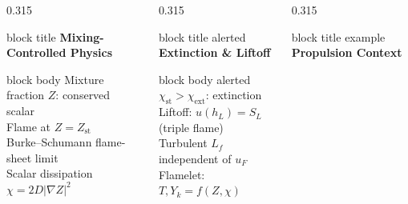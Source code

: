 \documentclass[12pt,aspectratio=169]{beamer}
\begin{document}
{\begin{frame}[plain, c]
  \begin{columns}[t, totalwidth=\textwidth]
    \begin{column}{0.315\textwidth}
      \begin{beamercolorbox}[rounded=true,wd=\linewidth,
                             sep=6pt,center]{block title}
        \textbf{\small Mixing-Controlled Physics}
      \end{beamercolorbox}
      \vspace{3pt}
      \begin{beamercolorbox}[rounded=true,wd=\linewidth,
                             sep=6pt,center]{block body}
        \color{ashgrey}\fontsize{7.5}{10}\selectfont
        Mixture fraction $Z$: conserved scalar\\[3pt]
        Flame at $Z = Z_{\text{st}}$\\[3pt]
        Burke--Schumann flame-sheet limit\\[3pt]
        Scalar dissipation $\chi = 2D|\nabla Z|^2$
      \end{beamercolorbox}
    \end{column}
    \hfill
    \begin{column}{0.315\textwidth}
      \begin{beamercolorbox}[rounded=true,wd=\linewidth,
                             sep=6pt,center]{block title alerted}
        \textbf{\small Extinction \& Liftoff}
      \end{beamercolorbox}
      \vspace{3pt}
      \begin{beamercolorbox}[rounded=true,wd=\linewidth,
                             sep=6pt,center]{block body alerted}
        \color{ashgrey}\fontsize{7.5}{10}\selectfont
        $\chi_{\text{st}} > \chi_{\text{ext}}$: extinction\\[3pt]
        Liftoff: $u(h_L) = S_L$ (triple flame)\\[3pt]
        Turbulent $L_f$ independent of $u_F$\\[3pt]
        Flamelet: $T,Y_k = f(Z,\chi)$
      \end{beamercolorbox}
    \end{column}
    \hfill
    \begin{column}{0.315\textwidth}
      \begin{beamercolorbox}[rounded=true,wd=\linewidth,
                             sep=6pt,center]{block title example}
        \textbf{\small Propulsion Context}
      \end{beamercolorbox}
      \vspace{3pt}

\end{column}
\end{columns}
\end{frame}}
\end{document}
